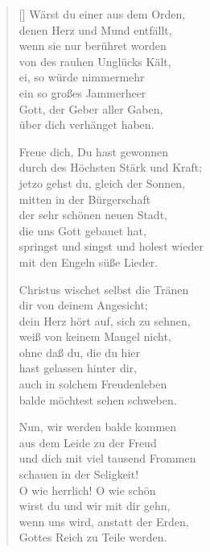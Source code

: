 \begin{multicols}{2}
\begin{verse}[\versewidth]
 Wärst du einer aus dem Orden,\\
denen Herz und Mund entfällt,\\
wenn sie nur berühret worden\\
von des rauhen Unglücks Kält,\\
ei, so würde nimmermehr\\
ein so großes Jammerheer\\
Gott, der Geber aller Gaben,\\
über dich verhänget haben.

 Freue dich, Du hast gewonnen\\
durch des Höchsten Stärk und Kraft;\\
jetzo gehst du, gleich der Sonnen,\\
mitten in der Bürgerschaft\\
der sehr schönen neuen Stadt,\\
die uns Gott gebauet hat,\\
springst und singst und holest wieder\\
mit den Engeln süße Lieder.

 Christus wischet selbst die Tränen\\
dir von deinem Angesicht;\\
dein Herz hört auf, sich zu sehnen,\\
weiß von keinem Mangel nicht,\\
ohne daß du, die du hier\\
hast gelassen hinter dir,\\
auch in solchem Freudenleben\\
balde möchtest sehen schweben.

 Nun, wir werden balde kommen\\
aus dem Leide zu der Freud\\
und dich mit viel tausend Frommen\\
schauen in der Seligkeit!\\
O wie herrlich! O wie schön\\
wirst du und wir mit dir gehn,\\
wenn uns wird, anstatt der Erden,\\
Gottes Reich zu Teile werden.

\end{verse}
\end{multicols}
